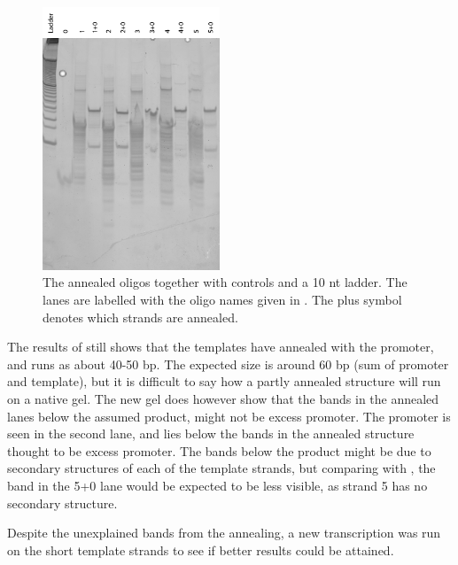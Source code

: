 \begin{figure}[H]
\centering
\includegraphics[width=200]{images/translator_annealing_2.png}
\caption{The annealed oligos together with controls and a 10 nt ladder. The lanes are labelled with the oligo names given in . The plus symbol denotes which strands are annealed.}
\label{translator_annealing_2}
\end{figure}

The results of  still shows that the templates have annealed with the promoter, and runs as about 40-50 bp. The expected size is around 60 bp (sum of promoter and template), but it is difficult to say how a partly annealed structure will run on a native gel. The new gel does however show that the bands in the annealed lanes below the assumed product, might not be excess promoter. The promoter is seen in the second lane, and lies below the bands in the annealed structure thought to be excess promoter. The bands below the product might be due to secondary structures of each of the template strands, but comparing with , the band in the 5+0 lane would be expected to be less visible, as strand 5 has no secondary structure.

Despite the unexplained bands from the annealing, a new transcription was run on the short template strands to see if better results could be attained.
